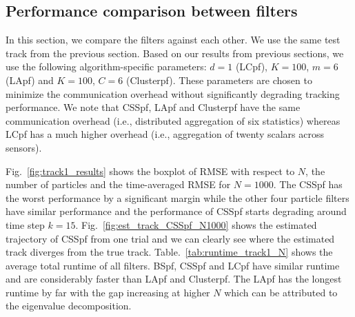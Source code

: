 \documentclass[10pt,letterpaper,final]{article}
\begin{document}
\subsection{Performance comparison between filters}
In this section, we compare the filters against each other. We use the same test track from the previous section. Based on our results from previous sections, we use the following algorithm-specific parameters: $d=1$ (LCpf), $K=100$, $m=6$ (LApf) and $K=100$, $C=6$ (Clusterpf). These parameters are chosen to minimize the communication overhead without significantly degrading tracking performance. We note that CSSpf, LApf and Clusterpf have the same communication overhead (i.e., distributed aggregation of six statistics) whereas LCpf has a much higher overhead (i.e., aggregation of twenty scalars across sensors). 

Fig.~\ref{fig:track1_results} shows the boxplot of RMSE with respect to $N$, the number of particles and the time-averaged RMSE for $N=1000$. The CSSpf has the worst performance by a significant margin while the other four particle filters have similar performance and the performance of CSSpf starts degrading around time step $k=15$. Fig.~\ref{fig:est_track_CSSpf_N1000} shows the estimated trajectory of CSSpf from one trial and we can clearly see where the estimated track diverges from the true track. Table.~\ref{tab:runtime_track1_N} shows the average total runtime of all filters. BSpf, CSSpf and LCpf have similar runtime and are considerably faster than LApf and Clusterpf. The LApf has the longest runtime by far with the gap increasing at higher $N$ which can be attributed to the eigenvalue decomposition. 
\end{document}
